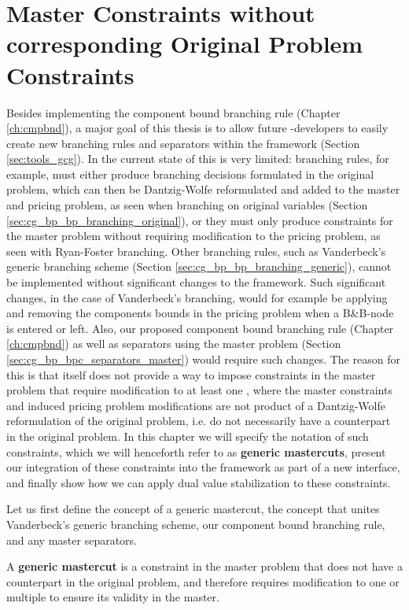 \chapter{Master Constraints without corresponding Original Problem Constraints}\label{ch:gm}
Besides implementing the component bound branching rule (Chapter \ref{ch:cmpbnd}), a major goal of this thesis is to allow future \GCG{}-developers to easily create new branching rules and separators within the framework (Section \ref{sec:tools_gcg}). In the current state of \GCG{} this is very limited: branching rules, for example, must either produce branching decisions formulated in the original problem, which can then be Dantzig-Wolfe reformulated and added to the master and pricing problem, as seen when branching on original variables (Section \ref{sec:cg_bp_bp_branching_original}), or they must only produce constraints for the master problem without requiring modification to the pricing problem, as seen with Ryan-Foster branching. Other branching rules, such as Vanderbeck's generic branching scheme (Section \ref{sec:cg_bp_bp_branching_generic}), cannot be implemented without significant changes to the \GCG{} framework. Such significant changes, in the case of Vanderbeck's branching, would for example be applying and removing the components bounds in the pricing problem when a B\&B-node is entered or left. Also, our proposed component bound branching rule (Chapter \ref{ch:cmpbnd}) as well as separators using the master problem (Section \ref{sec:cg_bp_bpc_separators_master}) would require such changes. The reason for this is that \GCG{} itself does not provide a way to impose constraints in the master problem that require modification to at least one \SP{}, where the master constraints and induced pricing problem modifications are not product of a Dantzig-Wolfe reformulation of the original problem, i.e. do not necessarily have a counterpart in the original problem. In this chapter we will specify the notation of such constraints, which we will henceforth refer to as \textbf{generic mastercuts}, present our integration of these constraints into the \GCG{} framework as part of a new interface, and finally show how we can apply dual value stabilization to these constraints.

Let us first define the concept of a generic mastercut, the concept that unites Vanderbeck's generic branching scheme, our component bound branching rule, and any master separators.

\begin{definition}
A \textbf{generic mastercut} is a constraint in the master problem that does not have a counterpart in the original problem, and therefore requires modification to one or multiple \SP{} to ensure its validity in the master.
\end{definition}

